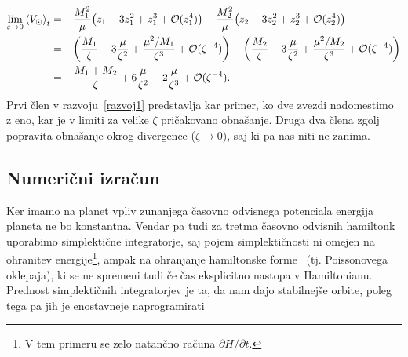\documentclass[12pt, a4paper]{article}
\newcommand{\avgt}[1]{
	\ensuremath{\left\langle #1 \right\rangle_t}
}
\begin{document}
\begin{align}
	\lim_{\varepsilon \to 0}\avgt{V_\odot} &= -\frac{M_1^2}{\mu}\big(z_1 - 3z_1^2 + z_1^3 + \mathcal{O}(z_1^4)\big)
			-\frac{M_2^2}{\mu}\big(z_2 - 3z_2^2 + z_2^3 + \mathcal{O}(z_2^4)\big) \notag \\
	&= -\bigg(\frac{M_1}{\zeta} - 3\frac{\mu}{\zeta^2} + \frac{\mu^2/M_1}{\zeta^3} + \mathcal{O}(\zeta^{-4})\bigg)
			-\bigg(\frac{M_2}{\zeta} - 3\frac{\mu}{\zeta^2} + \frac{\mu^2/M_2}{\zeta^3} + \mathcal{O}(\zeta^{-4})\bigg)
		\notag \\
	&= -\frac{M_1 + M_2}{\zeta} + 6\frac{\mu}{\zeta^2} - 2\frac{\mu}{\zeta^3} + \mathcal{O}(\zeta^{-4}).
	\label{razvoj1}
\end{align}
Prvi \v clen v razvoju~\eqref{razvoj1} predstavlja kar primer, ko dve zvezdi nadomestimo z eno, kar je v limiti za velike
$\zeta$ pri\v cakovano obna\v sanje. Druga dva \v clena zgolj popravita obna\v sanje okrog divergence ($\zeta \to 0$),
saj ki pa nas niti ne zanima.

\subsection{Numeri\v cni izra\v cun}
Ker imamo na planet vpliv zunanjega \v casovno odvisnega potenciala energija planeta ne bo konstantna. Vendar pa
tudi za tretma \v casovno odvisnih hamiltonk uporabimo simplekti\v cne integratorje, saj pojem simplekti\v cnosti
ni omejen na ohranitev energije\footnote{V tem primeru se zelo natan\v cno ra\v cuna $\partial H/\partial t$.}, ampak
na ohranjanje hamiltonske forme~\cite{sirca} (tj. Poissonovega oklepaja), ki se ne spremeni tudi \v ce \v cas
eksplicitno nastopa v Hamiltonianu. Prednost simplekti\v cnih integratorjev je ta, da nam dajo stabilnej\v se
orbite, poleg tega pa jih je enostavneje naprogramirati
\end{document}

